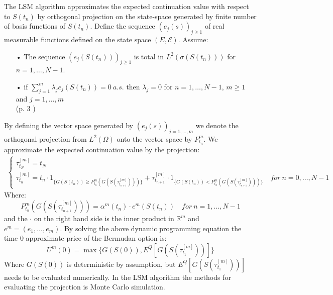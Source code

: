 The LSM algorithm approximates the expected continuation value with respect to $S(t_{n})$ by orthogonal projection on the state-space generated by finite number of basis functions of $S(t_{n})$. Define the sequence $(e_{j}(s))_{j\geq 1}$ of real measurable functions defined on the state space $(E,\mathcal{E})$. Assume:
\begin{enumerate}\label{AssumptionBasisFck}
\item[•] The sequence $(e_{j}(S(t_n)))_{j\geq 1}$ is total in $L^2(\sigma(S(t_n)))$ for $n=1,\ldots,N-1$.
\item[•] if $\sum_{j=1}^{m} \lambda_j e_{j}(S(t_n))=0 \ a.s.$ then $\lambda_j=0$ for $n=1,\ldots,N-1$, $m\geq 1$ and $j=1,\ldots,m$\\
\null \hfill (p. 3 \parencite{analysisLSM})
\end{enumerate}
By defining the vector space generated by $(e_{j}(s))_{j=1, \ldots, m}$ we denote the orthogonal projection from $L^2(\Omega)$ onto the vector space by $P^m_{t_n}$.
We approximate the expected continuation value by the projection:
\begin{equation*}\label{LSMDynamic2}
\begin{split}
\begin{cases}
          \tau_{t_N}^{[m]} = t_N\\
          \tau_{t_n}^{[m]} = t_n \cdot 1_{\{G(S(t_n)) \geq P^m_{t_n}(G(S(\tau^{[m]}_{t_{n+1}})))\}} + \tau^{[m]}_{t_{n+1}} \cdot 1_{\{G(S(t_n)) < P^m_{t_n}(G(S(\tau^{[m]}_{t_{n+1}}))) \}} \quad for \ n={0,\ldots,N-1} 
\end{cases}
\end{split}
\end{equation*}
Where:
$$P^m_{t_n}(G(S(\tau^{[m]}_{t_{n+1}})))=\alpha^{m}(t_{n}) \cdot e^m(S(t_{n})) \quad for \ n=1,\ldots,N-1$$
and the $\cdot$ on the right hand side is the inner product in $\mathbb{R}^m$ and $e^m=(e_1,\ldots, e_m)$.
By solving the above dynamic programming equation the time 0 approximate price of the Bermudan option is:
$$U^m(0)=\max \{ G(S(0)), E^Q[G(S(\tau^{[m]}_{t_1}))]\}$$
Where $G(S(0))$ is deterministic by assumption, but $E^Q[G(S(\tau^{[m]}_{t_1}))]$ needs to be evaluated numerically. In the LSM algorithm the methods for evaluating the projection is Monte Carlo simulation.\\

